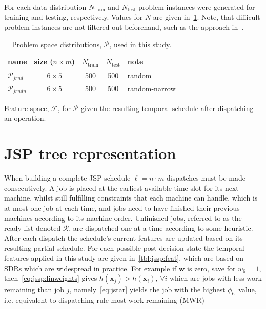 \documentclass[letterpaper]{article}
\renewcommand{\vec}[1]{\mathbf{#1}}
\newcommand{\phiwrmJob}{$\phi_6$}
\begin{document}
For each data distribution $N_{\text{train}}$  and $N_{\text{test}}$ problem instances were generated for training and testing, respectively. Values for $N$ are given in~\cref{tbl:data:sim}. Note, that difficult problem instances are not filtered out beforehand, such as the approach in~\cite{Whitley}. 

\begin{table}\centering
\caption{Problem space distributions, $\mathcal{P}$, used in this study. }\label{tbl:data:sim}
{\renewcommand{\arraystretch}{1.2}\footnotesize
\begin{tabular}{|l|c|c|c|l|}\hline 
name&size ($n\times m$)& $N_{\text{train}}$&$N_{\text{test}}$  & note 
\\ \hline\hline
$\mathcal{P}_{jrnd}$ & $6\times5$ & 500 & 500 & random \\
$\mathcal{P}_{jrndn}$ & $6\times5$ & 500 & 500 & random-narrow \\
\hline
\end{tabular}
}
\end{table}

\begin{table}  \centering
  \caption{Feature space, $\mathcal{F}$, for $\mathcal{P}$ given the resulting temporal schedule after dispatching an operation.  }
  \label{tbl:jssp:feat}
  
\end{table}

\section{JSP tree representation}\label{sec:gametree}
When building a complete JSP schedule $\ell=n\cdot m$ dispatches must be made consecutively. 
A job is placed at the earliest available time slot for its next machine, whilst still fulfilling constraints that each machine can handle, which is at most one job at each time, and jobs need to have finished their previous machines according to its machine order. 
Unfinished jobs, referred to as the ready-list denoted $\mathcal{R}$, are dispatched one at a time according to some heuristic. After each dispatch the schedule's current features are updated based on its resulting partial schedule. 
For each possible post-decision state the temporal features applied in this study are given in~\cref{tbl:jssp:feat}, which are based on SDRs which are widespread in practice. For example if $\vec{w}$ is zero, save for $w_6=1$, then~\cref{eq:jssp:linweights} gives $h(\vec{x}_j)>h(\vec{x}_i)$, 
$\forall i$ which are jobs with less work remaining than job $j$, namely~\eqref{eq:jstar} yields the job with the highest \phiwrmJob\ value, 
i.e. equivalent to dispatching rule most work remaining (MWR) 
\end{document}
